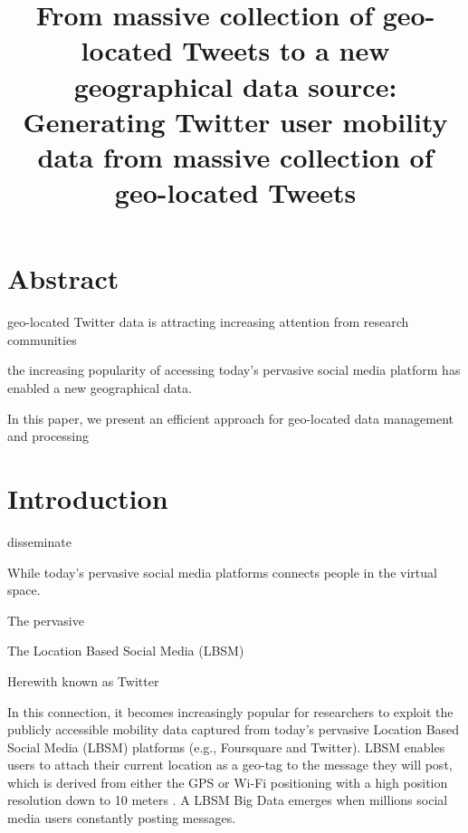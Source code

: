 \documentclass[a4paper,11pt]{article}
\begin{document}

\title{From massive collection of geo-located Tweets to a new geographical data source: Generating Twitter user mobility data from massive collection of geo-located Tweets}


\maketitle
\section*{Abstract}
geo-located Twitter data is attracting increasing attention from research communities


the increasing popularity of accessing today's pervasive social media platform has enabled a new geographical data.

In this paper, we present an efficient approach for geo-located data management and processing

\section{Introduction}



disseminate  

While today's pervasive social media platforms connects people in the virtual space.

The pervasive 


The Location Based Social Media (LBSM)

Herewith known as Twitter

In this connection, it becomes increasingly popular for researchers to exploit the publicly accessible mobility data captured from today's pervasive Location Based Social Media (LBSM) platforms (e.g., Foursquare and Twitter).
LBSM enables users to attach their current location as a geo-tag to the message they will post, which is derived from either the GPS or Wi-Fi positioning with a high position resolution down to 10 meters \cite{Jurdak2015}.
A LBSM Big Data emerges when millions social media users constantly posting messages.
\end{document}
